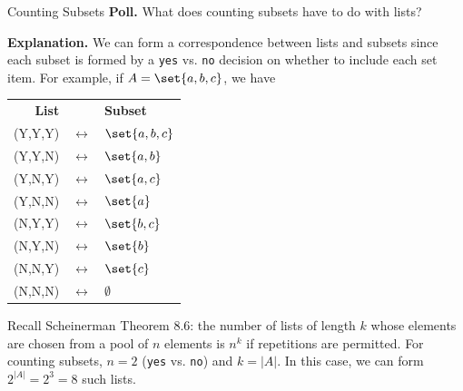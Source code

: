 \documentclass[10pt]{beamer}
\begin{document}
\begin{frame}{Counting Subsets}
\small 
\colorbox{yellow!30}{\textbf{Poll.}} What does counting subsets have to do with lists?

\vfill 
\pause 

\colorbox{green!30}{\textbf{Explanation.}}  We can form a correspondence between lists and subsets since each subset is formed by a \texttt{yes} vs. \texttt{no} decision on whether to include each set item.  For example, if $A=\set{a,b,c}$, we have

\begin{center}
\begin{tabular}{rcl}
\textbf{List} & & \textbf{Subset} \\
(Y,Y,Y) & $\leftrightarrow$ &	$\set{a,b,c}$  \\
(Y,Y,N) & $\leftrightarrow$ &	 $\set{a,b}$  \\
(Y,N,Y) & $\leftrightarrow$ &	 $\set{a,c}$  \\
(Y,N,N) & $\leftrightarrow$ &	 $\set{a}$  \\
(N,Y,Y) & $\leftrightarrow$ &	 $\set{b,c}$  \\
(N,Y,N) & $\leftrightarrow$ &	 $\set{b}$  \\
(N,N,Y) & $\leftrightarrow$ &	 $\set{c}$  \\
(N,N,N) & $\leftrightarrow$ & 	$\emptyset$  \\
\end{tabular}
\end{center}
\vfill \pause 
Recall Scheinerman Theorem 8.6: \alert{the number of lists of length $k$ whose elements are chosen from a pool of $n$ elements is $n^k$ if repetitions are permitted.}  For counting subsets, $n=2$ (\texttt{yes} vs. \texttt{no}) and $k=|A|$.   In this case, we can form $2^{|A|} = 2^3 = 8$ such lists.

 	
\end{frame}
\end{document}

